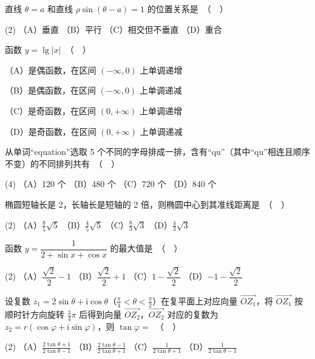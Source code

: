 \begin{question}
直线 $\theta = a$ 和直线 $\rho\sin(\theta - a) = 1$ 的位置关系是　（　）

\begin{gkopts}(2)
\task （A）垂直
\task （B）平行
\task （C）相交但不垂直
\task （D）重合
\end{gkopts}

\end{question}
\begin{question}
函数 $y = \lg |x|$　（　）

（A）是偶函数，在区间 $(-\infty, 0)$ 上单调递增

（B）是偶函数，在区间 $(-\infty, 0)$ 上单调递减

（C）是奇函数，在区间 $(0, +\infty)$ 上单调递增

（D）是奇函数，在区间 $(0, +\infty)$ 上单调递减

\end{question}
\begin{question}
从单词“equation”选取 5 个不同的字母排成一排，含有“qu”（其中“qu”相连且顺序不变）的不同排列共有　（　）

\begin{gkopts}(4)
\task （A）120 个
\task （B）480 个
\task （C）720 个
\task （D）840 个
\end{gkopts}

\end{question}
\begin{question}
椭圆短轴长是 2，长轴长是短轴的 2 倍，则椭圆中心到其准线距离是　（　）

\begin{gkopts}(2)
\task （A）$\frac{8}{5}\sqrt{5}$
\task （B）$\frac{4}{5}\sqrt{5}$
\task （C）$\frac{8}{3}\sqrt{3}$
\task （D）$\frac{4}{3}\sqrt{3}$
\end{gkopts}

\end{question}
\begin{question}
函数 $y = \dfrac{1}{2 + \sin x + \cos x}$ 的最大值是　（　）

\begin{gkopts}(2)
\task （A）$\dfrac{\sqrt{2}}{2} - 1$
\task （B）$\dfrac{\sqrt{2}}{2} + 1$
\task （C）$1 - \dfrac{\sqrt{2}}{2}$
\task （D）$-1 - \dfrac{\sqrt{2}}{2}$
\end{gkopts}

\end{question}
\begin{question}
设复数 $z_1 = 2\sin\theta + \mathrm{i}\cos\theta$（$\frac{\pi}{4} < \theta < \frac{\pi}{2}$）在复平面上对应向量 $\overrightarrow{OZ_1}$，将 $\overrightarrow{OZ_1}$ 按顺时针方向旋转 $\frac{3}{4}\pi$ 后得到向量 $\overrightarrow{OZ_2}$，$\overrightarrow{OZ_2}$ 对应的复数为 $z_2 = r(\cos\varphi + \mathrm{i}\sin\varphi)$，则 $\tan\varphi =$　（　）

\begin{gkopts}(2)
\task （A）$\frac{2\tan\theta + 1}{2\tan\theta - 1}$
\task （B）$\frac{2\tan\theta - 1}{2\tan\theta + 1}$
\task （C）$\frac{1}{2\tan\theta + 1}$
\task （D）$\frac{1}{2\tan\theta - 1}$
\end{gkopts}

\end{question}
